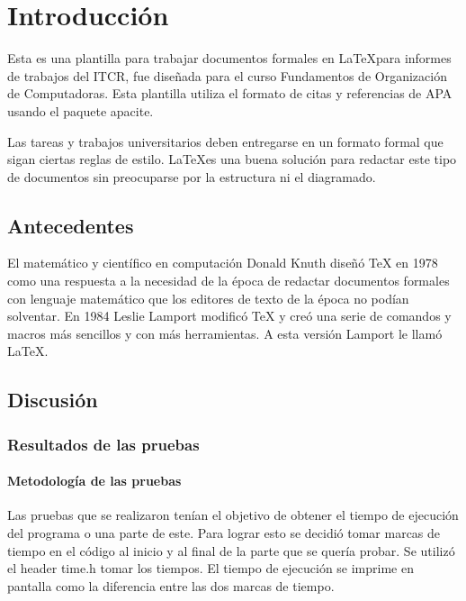 \documentclass{report}
\begin{document}


\tableofcontents

\chapter{Introducción}\label{intro}

Esta es una plantilla para trabajar documentos formales en \LaTeX para informes de trabajos del ITCR, fue diseñada para el curso Fundamentos de Organización de Computadoras.
Esta plantilla utiliza el formato de citas y referencias de APA usando el paquete apacite.

Las tareas y trabajos universitarios deben entregarse en un formato formal que sigan ciertas reglas de estilo. 
\LaTeX es una buena solución para redactar este tipo de documentos sin preocuparse por la estructura ni el diagramado.

\section{Antecedentes}\label{antecedentes}

El matemático y científico en computación Donald Knuth diseñó TeX en 1978 como una respuesta a la necesidad de la época de redactar documentos formales con lenguaje matemático que los editores de texto de la época no podían solventar. En 1984 Leslie Lamport modificó TeX y creó una serie de comandos y macros más sencillos y con más herramientas. A esta versión Lamport le llamó \LaTeX \cite{lopez18}.


\section{Discusión}
\subsection{Resultados de las pruebas}
\subsubsection{Metodología de las pruebas}

Las pruebas que se realizaron tenían el objetivo de obtener el tiempo de ejecución del programa o una parte de este. Para lograr esto se decidió tomar marcas de tiempo en el código al inicio y al final de la parte que se quería probar. Se utilizó el header time.h tomar los tiempos. El tiempo de ejecución  se imprime en pantalla como la diferencia entre las dos marcas de tiempo.
\end{document}
